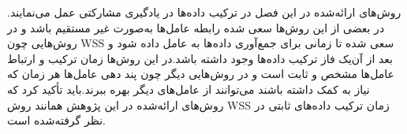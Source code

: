 روش‌های ارائه‌شده در این فصل در ترکیب داده‌ها در یادگیری مشارکتی عمل می‌نمایند. در بعضی از این روش‌ها سعی شده رابطه عامل‌ها به‌صورت غیر مستقیم باشد و در روش‌هایی چون WSS سعی شده تا زمانی برای جمع‌آوری داده‌ها به عامل داده شود و بعد از آن‌یک فاز ترکیب داده‌ها وجود داشته باشد.در این روش‌ها زمان ترکیب و ارتباط عامل‌ها مشخص و ثابت است و در روش‌هایی دیگر چون پند دهی عامل‌ها هر زمان که نیاز به کمک داشته باشند می‌توانند از عامل‌های دیگر بهره ببرند.باید تأکید کرد که روش‌های ارائه‌شده در این پژوهش همانند روش WSS زمان ترکیب داده‌های ثابتی در نظر گرفته‌شده است.

